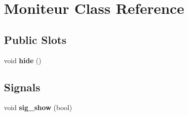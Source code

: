 \hypertarget{class_moniteur}{\section{\-Moniteur \-Class \-Reference}
\label{class_moniteur}
}
\subsection*{\-Public \-Slots}
\begin{DoxyCompactItemize}
\item 
\hypertarget{class_moniteur_a3a5780bf4147513e55f29dce6a3415c7}{void {\bfseries hide} ()}\label{class_moniteur_a3a5780bf4147513e55f29dce6a3415c7}

\end{DoxyCompactItemize}
\subsection*{\-Signals}
\begin{DoxyCompactItemize}
\item 
\hypertarget{class_moniteur_a4341889fd03a2da35ba7b3e8b5e88116}{void {\bfseries sig\-\_\-show} (bool)}\label{class_moniteur_a4341889fd03a2da35ba7b3e8b5e88116}

\end{DoxyCompactItemize}
